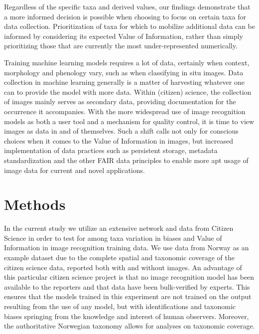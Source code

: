 \documentclass{article}
\begin{document}
Regardless of the specific taxa and derived values, our findings demonstrate that a more informed decision is possible when choosing to focus on certain taxa for data collection. Prioritization of taxa for which to mobilize additional data can be informed by considering its expected Value of Information, rather than simply prioritizing those that are currently the most under-represented numerically.

Training machine learning models requires a lot of data, certainly when context, morphology and phenology vary, such as when classifying in situ images. Data collection in machine learning generally is a matter of harvesting whatever one can to provide the model with more data. Within (citizen) science, the collection of images mainly serves as secondary data, providing documentation for the occurrence it accompanies. With the more widespread use of image recognition models as both a user tool and a mechanism for quality control, it is time to view images as data in and of themselves. Such a shift calls not only for conscious choices when it comes to the Value of Information in images, but increased implementation of data practices such as persistent storage, metadata standardization and the other FAIR data principles\autocite{Wilkinson2016} to enable more apt usage of image data for current and novel applications.


\section*{Methods}
In the current study we utilize an extensive network and data from Citizen Science in order to test for among taxa variation in biases and Value of Information in image recognition training data. We use data from Norway as an example dataset due to the complete spatial and taxonomic coverage of the citizen science data, reported both with and without images. An advantage of this particular citizen science project is that no image recognition model has been available to the reporters and that data have been bulk-verified by experts. This ensures that the models trained in this experiment are not trained on the output resulting from the use of any model, but with identifications and taxonomic biases springing from the knowledge and interest of human observers. Moreover, the authoritative Norwegian taxonomy allows for analyses on taxonomic coverage.
\end{document}
